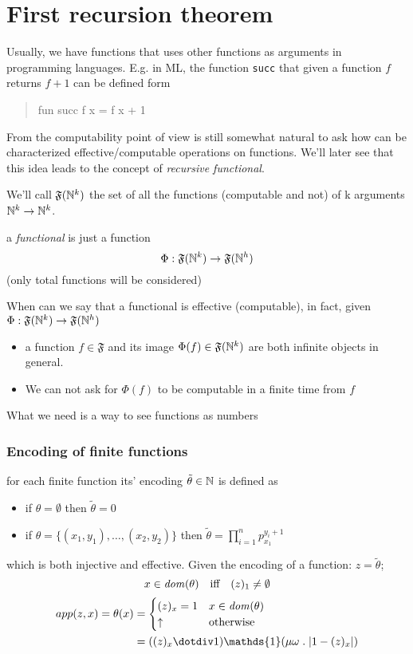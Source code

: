 \chapter{First recursion theorem}

Usually, we have functions that uses other functions as arguments
in programming languages.  E.g. in ML, the function \texttt{succ} that
given a function $f$ returns $f+1$ can be defined form
\begin{quote}
    fun succ f x = f x + 1
\end{quote}
From the computability point of view is still somewhat natural to ask
how can be characterized effective/computable operations on
functions. We'll later see that this idea leads to the concept of
\emph{recursive functional}.

\begin{definition}
  We'll call $\mathfrak{F}(\mathbb{N}^k)$ the set of all the functions
  (computable and not) of k arguments $\mathbb{N}^k \rightarrow \mathbb{N}^k$.
\end{definition}

a \emph{functional} is just a function
\[
  \Phi : \mathfrak{F}(\mathbb{N}^k) \rightarrow \mathfrak{F}(\mathbb{N}^h)
\]
(only total functions will be considered)

When can we say that a functional is effective (computable), in fact,
given $\Phi : \mathfrak{F}(\mathbb{N}^k) \rightarrow \mathfrak{F}(\mathbb{N}^h)$
\begin{itemize}
\item a function $f \in \mathfrak{F}$ and its image
  $\Phi(f) \in \mathfrak{F}(\mathbb{N}^k)$ are both infinite objects in
  general.
\item We can not ask for $\Phi(f)$ to be computable in a finite time
  from $f$
\end{itemize}

What we need is a way to see functions as numbers

\subsection{Encoding of finite functions}
for each finite function its' encoding $\tilde{\theta} \in \mathbb{N}$ is defined
as
\begin{itemize}
\item if $\theta = \emptyset$ then $\tilde{\theta} = 0$
\item if $\theta = \{(x_1, y_1), \dots, (x_2, y_2)\}$ then
  $\tilde{\theta} = \prod_{i=1}^n p_{x_1}^{y_i+1}$
\end{itemize}
which is both injective and effective. Given the encoding of a function:
$z= \tilde{\theta}$;
\[
  x \in \mathit{dom}({\theta}) \quad \mbox{iff} \quad (z)_1 \neq \emptyset
\]
\[
  \begin{aligned}
    app(z,x) = \theta(x) & = \begin{cases}
      (z)_x = 1 & x\in\dom{\theta} \\
      \uparrow & \mbox{otherwise}
    \end{cases} \\
    &= ((z)_x \dotdiv 1) \mathds{1}(\mu \omega \; . \; |1 - (z)_x|)
  \end{aligned}
\]

